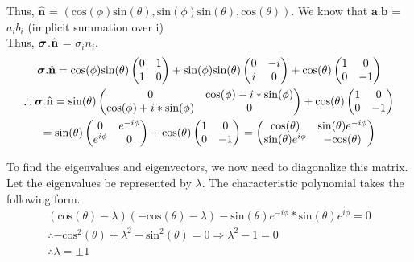 \begin{alphaparts}
Thus, $\hat{\mathbf{n}}$ = $(\textrm{cos}(\phi)\textrm{sin}(\theta), \textrm{sin}(\phi)\textrm{sin}(\theta), \textrm{cos}(\theta))$. We know that $\mathbf{a}.\mathbf{b}$ = $a_{i}b_{i}$ (implicit summation over i)\\
Thus, $\boldsymbol{\sigma}$.$\hat{\textbf{n}}$ = $\sigma_{i}n_{i}$.
\begin{gather*}
    \boldsymbol{\sigma}.\hat{\textbf{n}} = \textrm{cos}(\phi)\textrm{sin}(\theta)
    \begin{pmatrix}
        0 & 1 \\
        1 & 0
    \end{pmatrix} + \textrm{sin}(\phi)\textrm{sin}(\theta)
    \begin{pmatrix}
        0 & -i \\
        i & 0
    \end{pmatrix} + \textrm{cos}(\theta)
    \begin{pmatrix}
        1 & 0 \\
        0 & -1
    \end{pmatrix} \\
    \therefore \boldsymbol{\sigma}.\hat{\textbf{n}} = \textrm{sin}(\theta)
    \begin{pmatrix}
        0 & \textrm{cos}(\phi) - i*\textrm{sin}(\phi) \\
        \textrm{cos}(\phi) + i*\textrm{sin}(\phi) & 0
    \end{pmatrix} + \textrm{cos}(\theta)
    \begin{pmatrix}
        1 & 0 \\
        0 & -1
    \end{pmatrix} \\
    = \textrm{sin}(\theta)
    \begin{pmatrix}
        0 & e^{-i\phi} \\
        e^{i\phi} & 0
    \end{pmatrix} + \textrm{cos}(\theta)
    \begin{pmatrix}
        1 & 0 \\
        0 & -1
    \end{pmatrix} = 
    \begin{pmatrix}
        \textrm{cos}(\theta) & \textrm{sin}(\theta)e^{-i\phi} \\
        \textrm{sin}(\theta)e^{i\phi} & -\textrm{cos}(\theta)
    \end{pmatrix}
\end{gather*}

To find the eigenvalues and eigenvectors, we now need to diagonalize this matrix. Let the eigenvalues be represented by $\lambda$. The characteristic polynomial takes the following form.
\begin{gather*}
    (\textrm{cos}(\theta) - \lambda)(-\textrm{cos}(\theta) - \lambda) - \textrm{sin}(\theta)e^{-i\phi}*\textrm{sin}(\theta)e^{i\phi} = 0 \\
    \therefore -\textrm{cos}^{2}(\theta) + \lambda^{2} - \textrm{sin}^{2}(\theta) = 0  \Rightarrow \lambda^{2} - 1 = 0 \\
    \therefore \lambda = \pm 1
\end{gather*}


\end{alphaparts}
